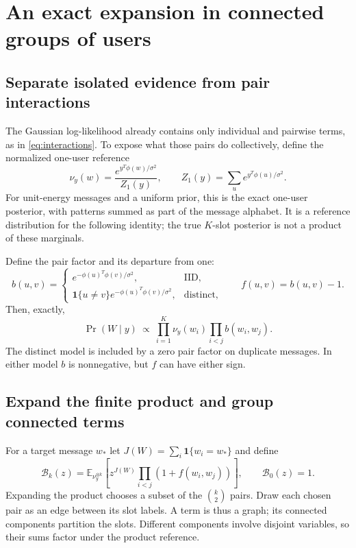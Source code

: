 \documentclass[10pt,a4paper]{article}
\newcommand{\E}{\mathbb E}
\newcommand{\ind}{\mathbf 1}
\begin{document}
\section{An exact expansion in connected groups of users}
\label{sec:connected-exact}
\subsection{Separate isolated evidence from pair interactions}
The Gaussian log-likelihood already contains only individual and pairwise terms, as in \eqref{eq:interactions}.
To expose what those pairs do collectively, define the normalized one-user reference
\begin{equation}
 \nu_y(w)=\frac{e^{y^T\phi(w)/\sigma^2}}{Z_1(y)},\qquad
 Z_1(y)=\sum_u e^{y^T\phi(u)/\sigma^2}.
 \label{eq:one-user-reference}
\end{equation}
For unit-energy messages and a uniform prior, this is the exact one-user posterior, with patterns summed as part
of the message alphabet. It is a reference distribution for the following identity; the true $K$-slot posterior
is not a product of these marginals.

Define the pair factor and its departure from one:
\begin{equation}
 b(u,v)=
 \begin{cases}
 e^{-\phi(u)^T\phi(v)/\sigma^2},&\text{IID},\\
 \ind\{u\ne v\}e^{-\phi(u)^T\phi(v)/\sigma^2},&\text{distinct},
 \end{cases}
 \qquad f(u,v)=b(u,v)-1.
 \label{eq:mayer-factor}
\end{equation}
Then, exactly,
\[
 \Pr(W\mid y)\ \propto\
       \prod_{i=1}^K\nu_y(w_i)\prod_{i<j}b(w_i,w_j).
\]
The distinct model is included by a zero pair factor on duplicate messages.
In either model $b$ is nonnegative, but $f$ can have either sign.

\subsection{Expand the finite product and group connected terms}
For a target message $w_*$ let $J(W)=\sum_i\ind\{w_i=w_*\}$ and define
\begin{equation}
 \mathcal B_k(z)=
 \E_{\nu_y^{\otimes k}}\!\left[z^{J(W)}\prod_{i<j}(1+f(w_i,w_j))\right],
 \qquad \mathcal B_0(z)=1.
 \label{eq:graph-partition}
\end{equation}
Expanding the product chooses a subset of the $\binom k2$ pairs. Draw each chosen pair as an edge between
its slot labels. A term is thus a graph; its connected components partition the slots.
Different components involve disjoint variables, so their sums factor under the product reference.
\end{document}
